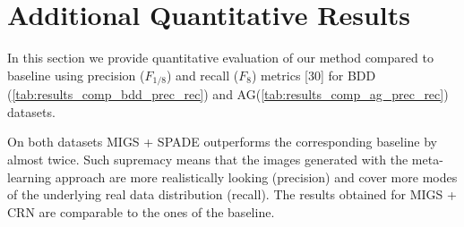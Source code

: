 \documentclass{bmvc2k}
\begin{document}
\section{Additional Quantitative Results}
In this section we provide quantitative evaluation of our method compared to baseline using precision ($F_{1/8}$) and recall ($F_8$) metrics [30] for BDD (\autoref{tab:results_comp_bdd_prec_rec}) and AG(\autoref{tab:results_comp_ag_prec_rec}) datasets.
\begin{table}[tbp]
    \centering
    \caption{Additional quantitative results on BDD100k fine-tuned on 5,10 and 160 shots.}
    \label{tab:results_comp_bdd_prec_rec}
\end{table}
On both datasets MIGS + SPADE outperforms the corresponding baseline by almost twice. Such supremacy means that the images generated with the meta-learning approach are more realistically looking (precision) and cover more modes of the underlying real data distribution (recall). The results obtained for MIGS + CRN are comparable to the ones of the baseline. 


\begin{table}[tbp]
    \centering
    \caption{Additional quantitative results on Action Genome dataset compared to related work. }
    \label{tab:results_comp_ag_prec_rec}
\end{table}
\end{document}
